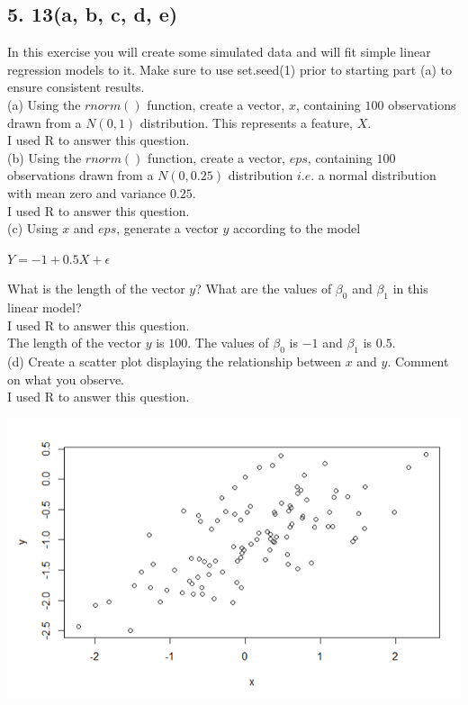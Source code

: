 \documentclass{article}
\begin{document}
\subsection*{5. 13(a, b, c, d, e)}
In this exercise you will create some simulated data and will fit simple
linear regression models to it. Make sure to use set.seed(1) prior to
starting part (a) to ensure consistent results. \\
(a) Using the $rnorm()$ function, create a vector, $x$, containing $100$
observations drawn from a $N(0, 1)$ distribution. This represents a feature, $X$. \\
\indent I used R to answer this question. \\
\linebreak (b) Using the $rnorm()$ function, create a vector, $eps$, containing $100$ observations drawn from a $N(0, 0.25)$ distribution $i.e.$ a normal
distribution with mean zero and variance $0.25$. \\
\indent I used R to answer this question. \\
\linebreak (c) Using $x$ and $eps$, generate a vector $y$ according to the model \\
\begin{center}
$Y = −1+0.5X + \epsilon$ 
\end{center}
What is the length of the vector $y$? What are the values of $\beta_0$
and $\beta_1$ in this linear model? \\
\indent I used R to answer this question. \\
\indent The length of the vector $y$ is $100$. The values of $\beta_0$ is $-1$ and $\beta_1$ is $0.5$. \\
\linebreak (d) Create a scatter plot displaying the relationship between $x$ and
$y$. Comment on what you observe. \\
\indent I used R to answer this question.
\begin{center}
\includegraphics[scale = 0.46]{5.13.d.png} \\
\end{center}
\end{document}
